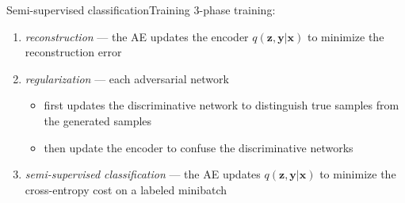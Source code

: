 \documentclass[10pt]{beamer}
\DeclareMathOperator{\Cat}{Cat}
\DeclareMathOperator{\Norm}{\mathcal N}
\DeclareMathOperator{\Id}{\mathbf I}
\newcommand{\vect}[1]{\boldsymbol{#1}} %
\begin{document}

\begin{frame}{Semi-supervised classification}{Training}
3-phase training:
\begin{enumerate}
  \item \textit{reconstruction} — the AE updates the encoder $ q(\vect z, \vect y | \vect x) $ to minimize the reconstruction error
  \item \textit{regularization} — each adversarial network
  \begin{itemize}
    \item first updates the discriminative network to distinguish true samples from the generated samples
    \item then update the encoder to confuse the discriminative networks
  \end{itemize}
  \item \textit{semi-supervised classification} — the AE updates $ q(\vect z, \vect y | \vect x) $ to minimize the cross-entropy cost on a labeled minibatch
\end{enumerate}
\end{frame}
\end{document}
